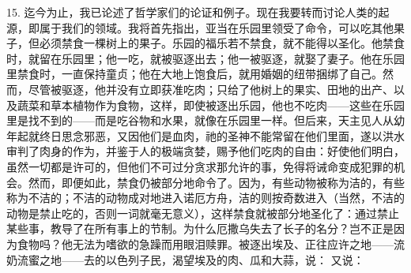 15. 迄今为止，我已论述了哲学家们的论证和例子。现在我要转而讨论人类的起源，即属于我们的领域。我将首先指出，亚当在乐园里领受了命令，可以吃其他果子，但必须禁食一棵树上的果子。乐园的福乐若不禁食，就不能得以圣化。他禁食时，就留在乐园里；他一吃，就被驱逐出去；他一被驱逐，就娶了妻子。他在乐园里禁食时，一直保持童贞；他在大地上饱食后，就用婚姻的纽带捆绑了自己。然而，尽管被驱逐，他并没有立即获准吃肉；只给了他树上的果实、田地的出产、以及蔬菜和草本植物作为食物，这样，即使被逐出乐园，他也不吃肉——这些在乐园里是找不到的——而是吃谷物和水果，就像在乐园里一样。但后来，天主见人从幼年起就终日思念邪恶，又因他们是血肉，祂的圣神不能常留在他们里面，遂以洪水审判了肉身的作为，并鉴于人的极端贪婪，赐予他们吃肉的自由：好使他们明白，虽然一切都是许可的，但他们不可过分贪求那允许的事，免得将诫命变成犯罪的机会。然而，即便如此，禁食仍被部分地命令了。因为，有些动物被称为洁的，有些称为不洁的；不洁的动物成对地进入诺厄方舟，洁的则按奇数进入（当然，不洁的动物是禁止吃的，否则一词就毫无意义），这样禁食就被部分地圣化了：通过禁止某些事，教导了在所有事上的节制。为什么厄撒乌失去了长子的名分？岂不正是因为食物吗？他无法为嗜欲的急躁而用眼泪赎罪。被逐出埃及、正往应许之地——流奶流蜜之地——去的以色列子民，渴望埃及的肉、瓜和大蒜，说：  又说： \par

